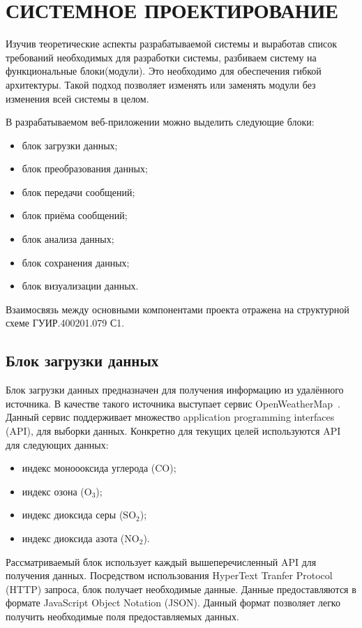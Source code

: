 \section{СИСТЕМНОЕ ПРОЕКТИРОВАНИЕ}
\label{sec:sys}

Изучив теоретические аспекты разрабатываемой системы и выработав
список требований необходимых для разработки системы, разбиваем систему
на функциональные блоки(модули). Это необходимо для обеспечения гибкой
архитектуры. Такой подход позволяет изменять или заменять модули без
изменения всей системы в целом.

В разрабатываемом веб-приложении можно выделить следующие
блоки:

\begin{itemize}
    \item блок загрузки данных;
    \item блок преобразования данных;
    \item блок передачи сообщений;
    \item блок приёма сообщений;
    \item блок анализа данных;
    \item блок сохранения данных;
    \item блок визуализации данных.
\end{itemize}
Взаимосвязь между основными компонентами проекта отражена на структурной схеме
ГУИР.400201.079 С1.

\subsection{Блок загрузки данных}

Блок загрузки данных предназначен для получения информацию из удалённого источника.
В качестве такого источника выступает сервис OpenWeatherMap~\cite{open_weather_map_index}.
Данный сервис поддерживает множество application programming interfaces (API), для выборки данных.
Конкретно для текущих целей используются API для следующих данных:
\begin{itemize}
    \item индекс моноооксида углерода ($ \text{CO} $);
    \item индекс озона ($ \text{O}_{\text{3}} $);
    \item индекс диоксида серы ($ \text{SO}_{\text{2}} $);
    \item индекс диоксида азота ($ \text{NO}_{\text{2}} $).
\end{itemize}

Рассматриваемый блок использует каждый вышеперечисленный API для получения данных.
Посредством использования HyperText Tranfer Protocol (HTTP) запроса, блок получает необходимые данные.
Данные предоставляются в формате JavaScript Object Notation (JSON).
Данный формат позволяет легко получить необходимые поля предоставляемых данных.

